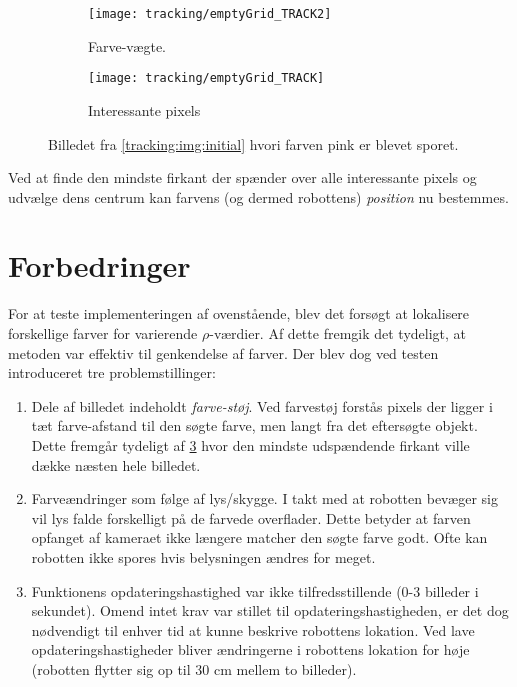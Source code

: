 \begin{figure}[h]
\centering
\begin{subfigure}[t]{0.48\textwidth}
\texttt{[image: tracking/emptyGrid\_TRACK2]}
\caption{Farve-vægte.}
\label{tracking:img:track:weight}
\end{subfigure}
\hfill
\begin{subfigure}[t]{0.48\textwidth}
\texttt{[image: tracking/emptyGrid\_TRACK]}
\caption{Interessante pixels}
\label{tracking:img:track:full}
\end{subfigure}

\caption{Billedet fra \cref{tracking:img:initial} hvori farven pink er blevet sporet.}
\end{figure}

Ved at finde den mindste firkant der spænder over alle interessante pixels og udvælge dens centrum kan farvens (og dermed robottens) \textit{position} nu bestemmes.

\section{Forbedringer}\label{tracking:improvements}
For at teste implementeringen af ovenstående, blev det forsøgt at lokalisere forskellige farver for varierende $\rho$-værdier.
Af dette fremgik det tydeligt, at metoden var effektiv til genkendelse af farver.
Der blev dog ved testen introduceret tre problemstillinger:
\begin{enumerate}
\item Dele af billedet indeholdt \emph{farve-støj}.
Ved farvestøj forstås pixels der ligger i tæt farve-afstand til den søgte farve, men langt fra det eftersøgte objekt.
Dette fremgår tydeligt af \cref{tracking:img:track:full} hvor den mindste udspændende firkant ville dække næsten hele billedet.
\item Farveændringer som følge af lys/skygge.
I takt med at robotten bevæger sig vil lys falde forskelligt på de farvede overflader.
Dette betyder at farven opfanget af kameraet ikke længere matcher den søgte farve godt.
Ofte kan robotten ikke spores hvis belysningen ændres for meget.
\item Funktionens opdateringshastighed var ikke tilfredsstillende (0-3 billeder i sekundet).
Omend intet krav var stillet til opdateringshastigheden, er det dog nødvendigt til enhver tid at kunne beskrive robottens lokation.
Ved lave opdateringshastigheder bliver ændringerne i robottens lokation for høje (robotten flytter sig op til 30 cm mellem to billeder).
\end{enumerate}

